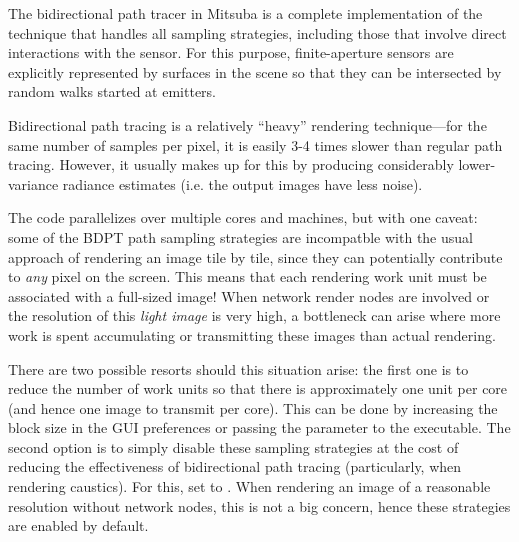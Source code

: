 The bidirectional path tracer in Mitsuba is a complete implementation of the
technique that handles all sampling strategies, including those that involve
direct interactions with the sensor. For this purpose, finite-aperture sensors
are explicitly represented by surfaces in the scene so that they can be
intersected by random walks started at emitters.

Bidirectional path tracing is a relatively ``heavy'' rendering technique---for
the same number of samples per pixel, it is easily 3-4 times slower than regular
path tracing. However, it usually makes up for this by producing considerably
lower-variance radiance estimates (i.e. the output images have less noise).

The code parallelizes over multiple cores and machines, but with one caveat:
some of the BDPT path sampling strategies are incompatble with the usual
approach of rendering an image tile by tile, since they can potentially
contribute to \emph{any} pixel on the screen. This means that each
rendering work unit must be associated with a full-sized image!
When network render nodes are involved or the resolution of this \emph{light image}
is very high, a bottleneck can arise where more work is spent  accumulating or
transmitting these images than actual rendering.

There are two possible resorts should this situation arise: the first one
is to reduce the number of work units so that there is approximately one
unit per core (and hence one image to transmit per core). This can be done by
increasing the block size in the GUI preferences or passing the 
parameter to the  executable. The second option is to simply
disable these sampling strategies at the cost of reducing the
effectiveness of bidirectional path tracing (particularly, when rendering
caustics). For this, set  to .
When rendering an image of a reasonable resolution without network nodes,
this is not a big concern, hence these strategies are enabled by default.

